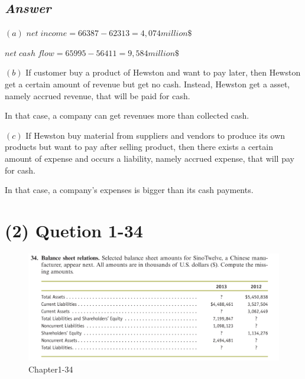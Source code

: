 \documentclass[
  a4paper,
  DIV=11,
  numbers=noendperiod]{scrreprt}
\begin{document}
\subsection*{\texorpdfstring{\textbf{\emph{Answer}}}{Answer}}\label{answer-12}

\textbf{\((a)\)} \(net\; income=66387-62313=4,074million\$\)

\(net\; cash\;flow=65995-56411=9,584million\$\)

\textbf{\((b)\)} If customer buy a product of Hewston and want to pay
later, then Hewston get a certain amount of revenue but get no cash.
Instead, Hewston get a asset, namely accrued revenue, that will be paid
for cash.

In that case, a company can get revenues more than collected cash.

\textbf{\((c)\)} If Hewston buy material from suppliers and vendors to
produce its own products but want to pay after selling product, then
there exists a certain amount of expense and occurs a liability, namely
accrued expense, that will pay for cash.

In that case, a company's expenses is bigger than its cash payments.

\section*{(2) Quetion 1-34}\label{quetion-1-34}


\begin{figure}[H]

{\centering \includegraphics{images/재무회계_hw2_1-34.png}

}

\caption{Chapter1-34}

\end{figure}%
\end{document}
